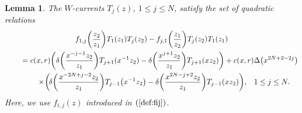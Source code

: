 \documentclass[10pt,a4paper]{amsart}
\numberwithin{equation}{section}
\newtheorem{Lemma}[Theorem]{Lemma}
\begin{document}
\begin{Lemma}\label{lemma:4-6}
The $W$-currents $T_j(z)$, $1\leq j \leq N$,
satisfy the set of quadratic relations
\begin{gather}
f_{1,j}\bigg(\frac{z_2}{z_1}\bigg)T_1(z_1)T_j(z_2)-
f_{j,1}\bigg(\frac{z_1}{z_2}\bigg)T_j(z_2)T_1(z_1)\notag
\\ \qquad
{}=c(x,r)\bigg(\delta\bigg(\frac{x^{-j-1}z_2}{z_1}\bigg)T_{j+1}(x^{-1}z_2)
-\delta\bigg(\frac{x^{j+1}z_2}{z_1}\bigg)T_{j+1}(x z_2)\bigg)
+c(x,r)\Delta\big(x^{2N+2-2j}\big)\notag
\\ \qquad\phantom{=}
{}\times\!\bigg(\!\delta\bigg(\frac{x^{-2N+j-2}z_2}{z_1}\bigg)T_{j-1}\big(x^{-1}z_2\big)
-\delta\bigg(\frac{x^{2N-j+2}z_2}{z_1}\bigg)T_{j-1}(x z_2)\bigg),
\quad\!
1\leq j \leq N.\!\!
\label{eqn:quadratic2}
\end{gather}
Here, we use $f_{i,j}(z)$ {introduced} in $(\ref{def:fij})$.
\end{Lemma}
\end{document}

